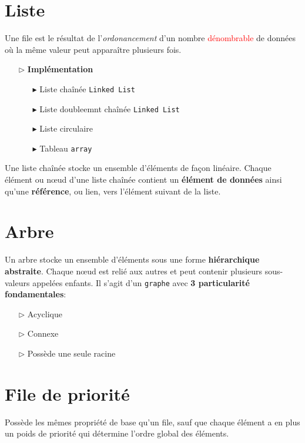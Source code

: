 \documentclass{report}
\begin{document}
\begin{multicols*}{3}
    \section{Liste}
    Une file est le résultat de l'\textit{ordonancement} d'un nombre 
    \textcolor{red}{dénombrable} de données où la même valeur 
    peut apparaître plusieurs fois. 

    \begin{itemize}
      \item [$\rhd$ ] \textbf{Implémentation}  
        \begin{itemize}
          \item [$\blacktriangleright$ ] Liste chaînée \texttt{Linked List}  
          \item [$\blacktriangleright$ ] Liste doubleemnt chaînée \texttt{Linked List}  
          \item [$\blacktriangleright$ ] Liste circulaire 

          \item [$\blacktriangleright$ ] Tableau \texttt{array}  
        \end{itemize}
    \end{itemize}


    \begin{note}{}{}
        Une liste chaînée stocke un ensemble d’éléments de 
        façon linéaire. Chaque élément ou nœud d’une liste chaînée 
        contient un \textbf{élément de données} ainsi qu’une 
        \textbf{référence}, ou lien, 
        vers l’élément suivant de la liste.       
    \end{note}


    \section{Arbre} 
    Un arbre stocke un ensemble d’éléments sous une
    forme \textbf{hiérarchique abstraite}. Chaque nœud est relié
    aux autres et peut contenir plusieurs sous-valeurs
    appelées enfants. Il s'agit d'un \texttt{graphe} avec 
    \textbf{3 particularité fondamentales}: 
    \begin{itemize}
      \item [$\rhd$ ] Acyclique
      \item [$\rhd$ ] Connexe
      \item [$\rhd$ ] Possède une seule racine
    \end{itemize}


    \section{File de priorité}
    Possède les mêmes propriété de base qu'un file, sauf que chaque 
    élément a en plus un poids de priorité qui détermine l'ordre 
    global des éléments. 


\end{multicols*}
\end{document}
